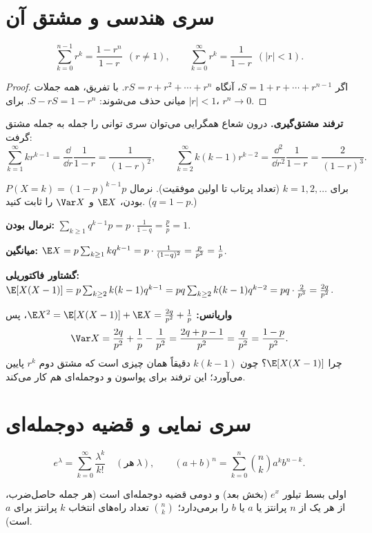 \section{سری هندسی و مشتق آن}

\begin{theorem}
\[
\sum_{k=0}^{n-1}r^k=\frac{1-r^n}{1-r}\ \ (r\neq1),\qquad\sum_{k=0}^{\infty}r^k=\frac{1}{1-r}\ \ (|r|<1).
\]
\end{theorem}
\begin{proof}
اگر $S=1+r+\cdots+r^{n-1}$، آنگاه $rS=r+r^2+\cdots+r^n$. با تفریق، همه جملات میانی حذف می‌شوند: $S-rS=1-r^n$. برای $|r|<1$، $r^n\to0$.
\end{proof}

\textbf{ترفند مشتق‌گیری.} درون شعاع همگرایی می‌توان سری توانی را جمله به جمله مشتق گرفت:
\[
\sum_{k=1}^\infty kr^{k-1}=\frac{\dd}{\dd r}\frac{1}{1-r}=\frac{1}{(1-r)^2},\qquad
\sum_{k=2}^\infty k(k-1)r^{k-2}=\frac{\dd^2}{\dd r^2}\frac{1}{1-r}=\frac{2}{(1-r)^3}.
\]

\begin{example}
$P(X=k)=(1-p)^{k-1}p$ برای $k=1,2,\ldots$ (تعداد پرتاب تا اولین موفقیت). نرمال بودن، $\E X$ و $\Var X$ را ثابت کنید. ($q=1-p$.)
\begin{solution}
\textbf{نرمال بودن:} $\sum_{k\ge1}q^{k-1}p=p\cdot\frac{1}{1-q}=\frac pp=1$.

\textbf{میانگین:} $\E X=p\sum_{k\ge1}kq^{k-1}=p\cdot\frac{1}{(1-q)^2}=\frac{p}{p^2}=\frac1p$.

\textbf{گشتاور فاکتوریلی:} $\E[X(X-1)]=p\sum_{k\ge2}k(k-1)q^{k-1}=pq\sum_{k\ge2}k(k-1)q^{k-2}=pq\cdot\frac{2}{p^3}=\frac{2q}{p^2}$.

\textbf{واریانس:} $\E X^2=\E[X(X-1)]+\E X=\frac{2q}{p^2}+\frac1p$، پس
\[
\Var X=\frac{2q}{p^2}+\frac1p-\frac1{p^2}=\frac{2q+p-1}{p^2}=\frac{q}{p^2}=\frac{1-p}{p^2}.
\]
چرا $\E[X(X-1)]$؟ چون $k(k-1)$ دقیقاً همان چیزی است که مشتق دوم $r^k$ پایین می‌آورد؛ این ترفند برای پواسون و دوجمله‌ای هم کار می‌کند.
\end{solution}
\end{example}

\section{سری نمایی و قضیه دوجمله‌ای}

\begin{theorem}
\[
e^\lambda=\sum_{k=0}^\infty\frac{\lambda^k}{k!}\quad(\text{هر}\ \lambda),\qquad
(a+b)^n=\sum_{k=0}^n\binom nka^kb^{n-k}.
\]
\end{theorem}
اولی بسط تیلور $e^x$ (بخش بعد) و دومی قضیه دوجمله‌ای است (هر جمله حاصل‌ضرب، از هر یک از $n$ پرانتز یا $a$ یا $b$ را برمی‌دارد؛ $\binom nk$ تعداد راه‌های انتخاب $k$ پرانتز برای $a$ است).

